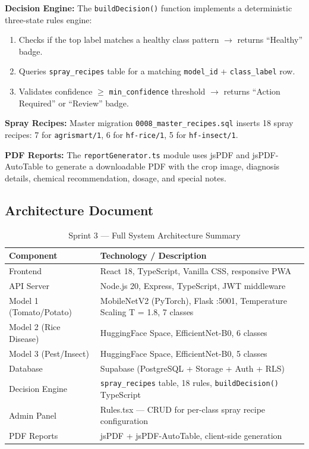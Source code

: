 \documentclass[12pt,a4paper]{report}
\begin{document}
\textbf{Decision Engine:} The \texttt{buildDecision()} function implements a deterministic three-state rules engine:
\begin{enumerate}
    \item Checks if the top label matches a healthy class pattern $\rightarrow$ returns ``Healthy'' badge.
    \item Queries \texttt{spray\_recipes} table for a matching \texttt{model\_id} + \texttt{class\_label} row.
    \item Validates confidence $\geq$ \texttt{min\_confidence} threshold $\rightarrow$ returns ``Action Required'' or ``Review'' badge.
\end{enumerate}

\textbf{Spray Recipes:} Master migration \texttt{0008\_master\_recipes.sql} inserts 18 spray recipes: 7 for \texttt{agrismart/1}, 6 for \texttt{hf-rice/1}, 5 for \texttt{hf-insect/1}.

\textbf{PDF Reports:} The \texttt{reportGenerator.ts} module uses jsPDF and jsPDF-AutoTable to generate a downloadable PDF with the crop image, diagnosis details, chemical recommendation, dosage, and special notes.

\subsection{Architecture Document}

\begin{table}[H]
\centering
\caption{Sprint 3 --- Full System Architecture Summary}
\label{tab:sprint3_arch_table}
\renewcommand{\arraystretch}{1.4}
\begin{tabular}{|p{4cm}|p{10cm}|}
\hline
\textbf{Component} & \textbf{Technology / Description} \\
\hline
Frontend & React 18, TypeScript, Vanilla CSS, responsive PWA \\
\hline
API Server & Node.js 20, Express, TypeScript, JWT middleware \\
\hline
Model 1 (Tomato/Potato) & MobileNetV2 (PyTorch), Flask :5001, Temperature Scaling T = 1.8, 7 classes \\
\hline
Model 2 (Rice Disease) & HuggingFace Space, EfficientNet-B0, 6 classes \\
\hline
Model 3 (Pest/Insect) & HuggingFace Space, EfficientNet-B0, 5 classes \\
\hline
Database & Supabase (PostgreSQL + Storage + Auth + RLS) \\
\hline
Decision Engine & \texttt{spray\_recipes} table, 18 rules, \texttt{buildDecision()} TypeScript \\
\hline
Admin Panel & Rules.tsx --- CRUD for per-class spray recipe configuration \\
\hline
PDF Reports & jsPDF + jsPDF-AutoTable, client-side generation \\
\hline
\end{tabular}
\end{table}
\end{document}
